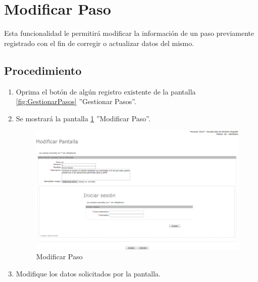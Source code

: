 \hypertarget{cv:modificarPaso}{\section{Modificar Paso}} \label{sec:modificarPaso}

	Esta funcionalidad le permitirá modificar la información de un paso previamente registrado con el fin de corregir o actualizar datos del mismo. 

		\subsection{Procedimiento}

			\begin{enumerate}
	
			\item Oprima el botón \IUEditar{} de algún registro existente de la pantalla \ref{fig:GestionarPasos} ''Gestionar Pasos''.
	
			\item Se mostrará la pantalla \ref{fig:modificarPaso} ''Modificar Paso''.
			
			\begin{figure}[htbp!]
				\begin{center}
					\includegraphics[scale=0.5]{roles/lider/casosUso/pantallas/IU11-2modificarPantalla}
					\caption{Modificar Paso}
					\label{fig:modificarPaso}
				\end{center}
			\end{figure}
		
			\item Modifique los datos solicitados por la pantalla.
			

\end{enumerate}
